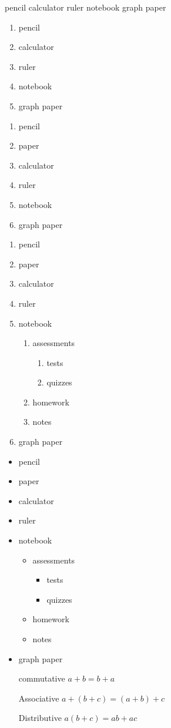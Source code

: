 \documentclass[11pt]{article}
\begin{document}
pencil
calculator
ruler
notebook
graph paper

\begin{enumerate}
\item pencil
\item calculator
\item ruler
\item notebook
\item graph paper
\end{enumerate}

\begin{enumerate}
\item pencil
\item paper
\item calculator
\item ruler
\item notebook
\item graph paper
\end{enumerate}

\begin{enumerate}
\item pencil
\item paper
\item calculator
\item ruler
\item notebook
	\begin{enumerate}
	\item assessments
		\begin{enumerate}
		\item tests
		\item quizzes
		\end{enumerate}
	\item homework
	\item notes
	\end{enumerate}
\item graph paper
\end{enumerate}

\begin{itemize}

\item pencil
\item paper
\item calculator
\item ruler
\item notebook
	\begin{itemize}
	\item assessments
		\begin{itemize}
		\item tests
		\item quizzes
		\end{itemize}
	\item homework
	\item notes
	\end{itemize}
\item graph paper
\end{itemize}

\begin{enumerate}
\item[commutative] $a+b=b+a$
\item[Associative] $a+(b+c)=(a+b)+c$
\item[Distributive] $a(b+c)=ab+ac$
\end{enumerate}
\end{document}
